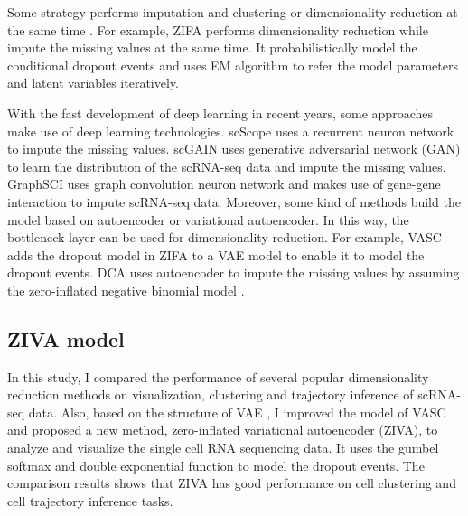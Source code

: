 Some strategy performs imputation and clustering or dimensionality reduction at the same time \cite{lin2017cidr}. For example, ZIFA \cite{Pierson2015} performs dimensionality reduction while impute the missing values at the same time. It probabilistically model the conditional dropout events and uses EM algorithm \cite{mclachlan2007algorithm} to refer the model parameters and latent variables iteratively. 

With the fast development of deep learning in recent years, some approaches make use of deep learning technologies. scScope \cite{Deng2019} uses a recurrent neuron network to impute the missing values. scGAIN \cite{gunady2019scgain} uses generative adversarial network (GAN) to learn the distribution of the scRNA-seq data and impute the missing values. GraphSCI \cite{rao2020imputing} uses graph convolution neuron network and makes use of gene-gene interaction to impute scRNA-seq data. Moreover, some kind of methods build the model based on autoencoder or variational autoencoder. In this way, the bottleneck layer can be used for dimensionality reduction. For example, VASC \cite{Wang2018} adds the dropout model in ZIFA to a VAE model to enable it to model the dropout events. DCA \cite{Eraslan2019a} uses autoencoder to impute the missing values by assuming the zero-inflated negative binomial model \cite{Hafemeister2019}. 

\subsection{ZIVA model}
In this study, I compared the performance of several popular dimensionality reduction methods on visualization, clustering and trajectory inference of scRNA-seq data. Also, based on the structure of VAE \cite{Kingma2014}, I improved the model of VASC \cite{Wang2018} and proposed a new method, zero-inflated variational autoencoder (ZIVA), to analyze and visualize the single cell RNA sequencing data. It uses the gumbel softmax and double exponential function to model the dropout events. The comparison results shows that ZIVA has good performance on cell clustering and cell trajectory inference tasks.

